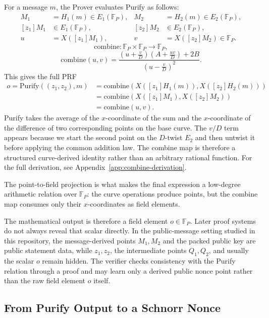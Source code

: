 \documentclass[11pt]{article}
\begin{document}
For a message $m$, the Prover evaluates Purify as follows:
\[
\begin{aligned}
M_1 &= H_1(m) \in E_1(\mathbb{F}_P), &
M_2 &= H_2(m) \in E_2(\mathbb{F}_P), \\
[z_1]M_1 &\in E_1(\mathbb{F}_P), &
[z_2]M_2 &\in E_2(\mathbb{F}_P), \\
u &= X([z_1]M_1), &
v &= X([z_2]M_2) \in \mathbb{F}_P.
\end{aligned}
\]
\[
\mathrm{combine} : \mathbb{F}_P \times \mathbb{F}_P \to \mathbb{F}_P,
\]
\[
\mathrm{combine}(u,v)
=
\frac{\left(u + \frac{v}{D}\right)\left(A + \frac{uv}{D}\right) + 2B}
     {\left(u - \frac{v}{D}\right)^2}.
\]
This gives the full PRF
\[
\begin{aligned}
o = \mathrm{Purify}((z_1,z_2), m)
&= \mathrm{combine}(X([z_1]H_1(m)), X([z_2]H_2(m))) \\
&= \mathrm{combine}(X([z_1]M_1), X([z_2]M_2)) \\
&= \mathrm{combine}(u,v).
\end{aligned}
\]
Purify takes the average of the $x$-coordinate of the sum and the $x$-coordinate of the
difference of two corresponding points on the base curve. The $v / D$ term appears because we
start the second point on the $D$-twist $E_2$ and then untwist it before applying the common
addition law. The combine map is therefore a structured curve-derived identity rather than an
arbitrary rational function. For the full derivation, see Appendix~\ref{app:combine-derivation}.

The point-to-field projection is what makes the final expression a low-degree arithmetic relation
over $\mathbb{F}_P$: the curve operations produce points, but the combine map consumes only their
$x$-coordinates as field elements.

The mathematical output is therefore a field element $o \in \mathbb{F}_P$. Later proof systems do
not always reveal that scalar directly. In the public-message setting studied in this
repository, the message-derived points $M_1,M_2$ and the packed public key are public statement
data, while $z_1,z_2$, the intermediate points $Q_1,Q_2$, and usually the scalar $o$ remain
hidden. The verifier checks consistency with the Purify relation through a proof and may learn only
a derived public nonce point rather than the raw field element $o$ itself.

\subsection{From Purify Output to a Schnorr Nonce}
\end{document}
